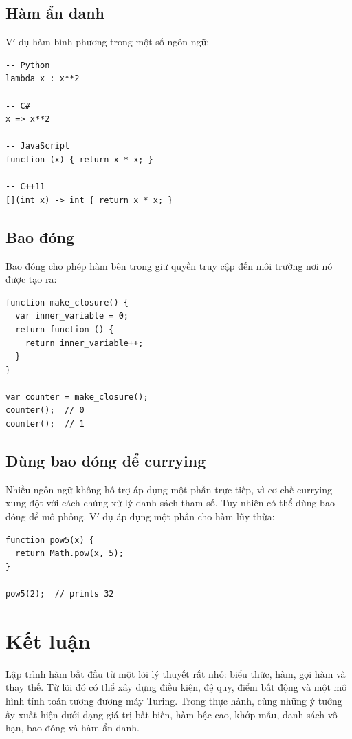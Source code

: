 \documentclass[11pt]{article}
\begin{document}
\subsection{Hàm ẩn danh}

Ví dụ hàm bình phương trong một số ngôn ngữ:
\begin{verbatim}
-- Python
lambda x : x**2

-- C#
x => x**2

-- JavaScript
function (x) { return x * x; }

-- C++11
[](int x) -> int { return x * x; }
\end{verbatim}

\subsection{Bao đóng}

Bao đóng cho phép hàm bên trong giữ quyền truy cập đến môi trường nơi nó được
tạo ra:
\begin{verbatim}
function make_closure() {
  var inner_variable = 0;
  return function () {
    return inner_variable++;
  }
}

var counter = make_closure();
counter();  // 0
counter();  // 1
\end{verbatim}

\subsection{Dùng bao đóng để currying}

Nhiều ngôn ngữ không hỗ trợ áp dụng một phần trực tiếp, vì cơ chế currying
xung đột với cách chúng xử lý danh sách tham số. Tuy nhiên có thể dùng bao
đóng để mô phỏng. Ví dụ áp dụng một phần cho hàm lũy thừa:
\begin{verbatim}
function pow5(x) {
  return Math.pow(x, 5);
}

pow5(2);  // prints 32
\end{verbatim}

\section{Kết luận}

Lập trình hàm bắt đầu từ một lõi lý thuyết rất nhỏ: biểu thức, hàm, gọi hàm
và thay thế. Từ lõi đó có thể xây dựng điều kiện, đệ quy, điểm bất động và
một mô hình tính toán tương đương máy Turing. Trong thực hành, cùng những ý
tưởng ấy xuất hiện dưới dạng giá trị bất biến, hàm bậc cao, khớp mẫu, danh
sách vô hạn, bao đóng và hàm ẩn danh.
\end{document}
